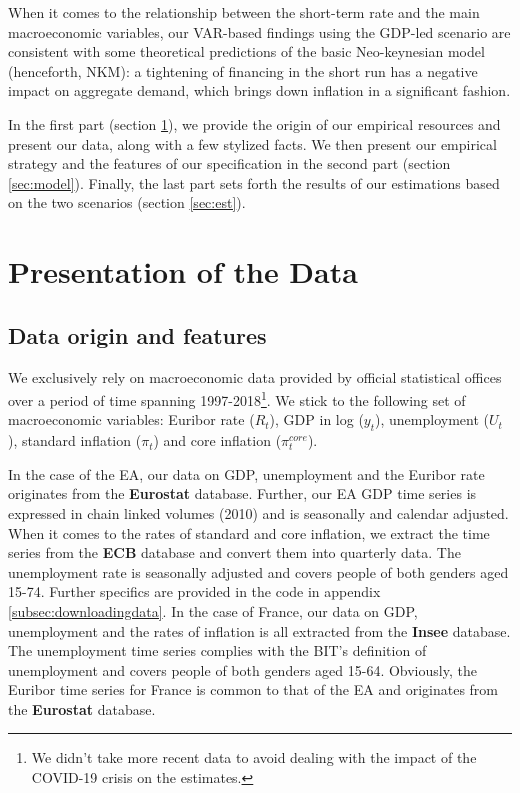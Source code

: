 \documentclass[
  11pt,
]{article}
\begin{document}
When it comes to the relationship between the short-term rate and the main macroeconomic variables, our VAR-based findings using the GDP-led scenario are consistent with some theoretical predictions of the basic Neo-keynesian model (henceforth, NKM): a tightening of financing in the short run has a negative impact on aggregate demand, which brings down inflation in a significant fashion.

In the first part (section \ref{sec:data}), we provide the origin of our empirical resources and present our data, along with a few stylized facts. We then present our empirical strategy and the features of our specification in the second part (section \ref{sec:model}). Finally, the last part sets forth the results of our estimations based on the two scenarios (section \ref{sec:est}).

\pagebreak

\hypertarget{sec:data}{%
\section{Presentation of the Data}\label{sec:data}}

\hypertarget{data-origin-and-features}{%
\subsection{Data origin and features}\label{data-origin-and-features}}

We exclusively rely on macroeconomic data provided by official statistical offices over a period of time spanning 1997-2018\footnote{
  We didn't take more recent data to avoid dealing with the impact of the COVID-19 crisis on the estimates.}. We stick to the following set of macroeconomic variables: Euribor rate (\(R_t\)), GDP in log (\(y_t\)), unemployment (\(U_t\)), standard inflation (\(\pi_t\)) and core inflation (\(\pi_t^{core}\)).

In the case of the EA, our data on GDP, unemployment and the Euribor rate originates from the \textbf{Eurostat} database. Further, our EA GDP time series is expressed in chain linked volumes (2010) and is seasonally and calendar adjusted. When it comes to the rates of standard and core inflation, we extract the time series from the \textbf{ECB} database and convert them into quarterly data. The unemployment rate is seasonally adjusted and covers people of both genders aged 15-74. Further specifics are provided in the code in appendix \ref{subsec:downloadingdata}. In the case of France, our data on GDP, unemployment and the rates of inflation is all extracted from the \textbf{Insee} database. The unemployment time series complies with the BIT's definition of unemployment and covers people of both genders aged 15-64. Obviously, the Euribor time series for France is common to that of the EA and originates from the \textbf{Eurostat} database.
\end{document}
